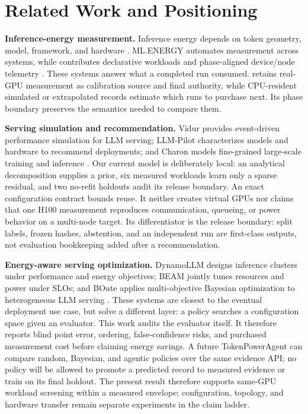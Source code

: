 \section{Related Work and Positioning}

\textbf{Inference-energy measurement.}  Inference energy depends on token
geometry, model, framework, and hardware
\cite{samsi2023words,fernandez2025energy}.  ML.ENERGY automates measurement
across systems, while \bench{} contributes
declarative workloads and phase-aligned device/node telemetry
\cite{chung2025mlenergy,niu2026tokenpowerbench}.  These systems answer what a
completed run consumed.  \system{} retains real-GPU measurement as calibration
source and final authority, while CPU-resident simulated or extrapolated
records estimate which runs to purchase next.  Its phase boundary preserves the
semantics needed to compare them.

\textbf{Serving simulation and recommendation.}  Vidur provides event-driven
performance simulation for LLM serving; LLM-Pilot characterizes models and
hardware to recommend deployments; and Charon models fine-grained large-scale
training and inference \cite{agrawal2024vidur,lazuka2024llmpilot,
yang2026charon}.  Our current model is deliberately local: an analytical
decomposition supplies a prior, six measured workloads learn only a sparse
residual, and two no-refit holdouts audit its release boundary.  An exact
configuration contract bounds reuse.  It neither creates virtual GPUs nor claims that one
H100 measurement reproduces communication, queueing, or power behavior on a
multi-node target.  Its differentiator is the release boundary: split labels,
frozen hashes, abstention, and an independent run are first-class outputs, not
evaluation bookkeeping added after a recommendation.

\textbf{Energy-aware serving optimization.}  DynamoLLM designs inference
clusters under performance and energy objectives; BEAM jointly tunes resources
and power under SLOs; and BOute applies multi-objective Bayesian optimization to
heterogeneous LLM serving \cite{stojkovic2025dynamollm,lee2026beam,
jiang2026boute}.  These systems are closest to the eventual deployment use
case, but solve a different layer: a policy searches a configuration space
given an evaluator.  This work audits the evaluator itself.  It therefore
reports blind point error, ordering, false-confidence risks, and purchased
measurement cost before claiming energy savings.  A future TokenPowerAgent can
compare random, Bayesian, and agentic policies over the same evidence API; no
policy will be allowed to promote a predicted record to measured evidence or
train on its final holdout.  The present result therefore supports same-GPU
workload screening within a measured envelope; configuration, topology, and
hardware transfer remain separate experiments in the claim ladder.
